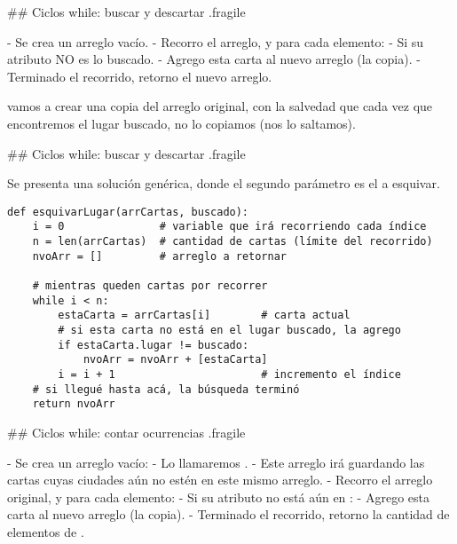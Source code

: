 ## Ciclos while: buscar y descartar {.fragile}


\vspace{1ex}

- Se crea un arreglo vacío.
- Recorro el arreglo, y para cada elemento:
    - Si su atributo  \alert{NO} es lo buscado.
        - Agrego esta carta al nuevo arreglo (la copia).
- Terminado el recorrido, retorno el nuevo arreglo.

\bgnblockidea
{} vamos a crear una copia del arreglo
original, con la salvedad que cada vez que encontremos el lugar buscado,
no lo copiamos (nos lo saltamos).
\trmblockidea

## Ciclos while: buscar y descartar {.fragile}


\footnotesize Se presenta una solución genérica, donde el segundo parámetro es el  a esquivar.

\begin{lstlisting}[style=frame02]
def esquivarLugar(arrCartas, buscado):
    i = 0               # variable que irá recorriendo cada índice
    n = len(arrCartas)  # cantidad de cartas (límite del recorrido)
    nvoArr = []         # arreglo a retornar

    # mientras queden cartas por recorrer
    while i < n:
        estaCarta = arrCartas[i]        # carta actual
        # si esta carta no está en el lugar buscado, la agrego
        if estaCarta.lugar != buscado:
            nvoArr = nvoArr + [estaCarta]
        i = i + 1                       # incremento el índice
    # si llegué hasta acá, la búsqueda terminó
    return nvoArr
\end{lstlisting}


## Ciclos while: contar ocurrencias {.fragile}


\vspace{1ex}

- Se crea un arreglo vacío:
    - Lo llamaremos .
    - Este arreglo irá guardando las cartas cuyas ciudades aún no estén en este
    mismo arreglo.
- Recorro el arreglo original, y para cada elemento:
    - Si su atributo  no está aún en :
        - Agrego esta carta al nuevo arreglo (la copia).
- Terminado el recorrido, retorno la cantidad de elementos de .

